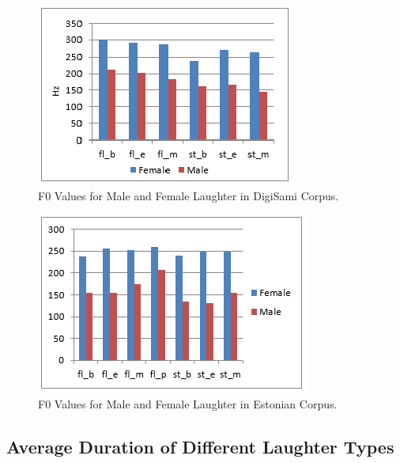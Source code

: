\documentclass[10pt,journal,compsoc]{IEEEtran}
\begin{document}
\begin{figure}[!t]
\centering
\includegraphics[width=1\linewidth]{images/F0-DigiSami.png}
\caption{F0 Values for Male and Female Laughter in DigiSami Corpus.}
\label{fig:f0-digisami}
\end{figure}

\begin{figure}[!t]
\centering
\includegraphics[width=1\linewidth]{images/F0-MINT.png}
\caption{F0 Values for Male and Female Laughter in Estonian Corpus.}
\label{fig:f0-estonian}
\end{figure}

\subsection{Average Duration of Different Laughter Types}
\end{document}
